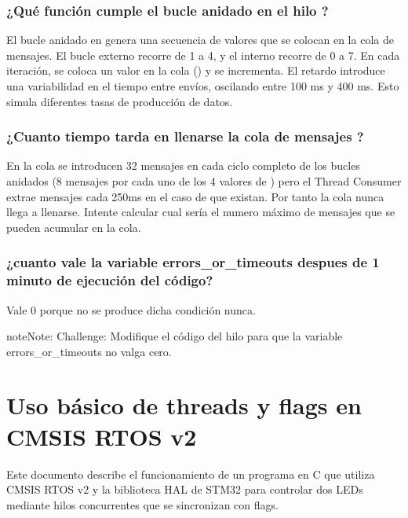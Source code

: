 \documentclass[letterpaper,10pt,english]{sphinxmanual}
\begin{document}
\subsection{¿Qué función cumple el bucle anidado en el hilo ?}
\label{\detokenize{ejemplothreads-queues:que-funcion-cumple-el-bucle-anidado-en-el-hilo-producer}}
\sphinxAtStartPar
El bucle anidado en  genera una secuencia de valores que se colocan en la cola de mensajes. El bucle externo recorre  de 1 a 4, y el interno recorre  de 0 a 7. En cada iteración, se coloca un valor en la cola () y se incrementa. El retardo  introduce una variabilidad en el tiempo entre envíos, oscilando entre 100 ms y 400 ms. Esto simula diferentes tasas de producción de datos.


\subsection{¿Cuanto tiempo tarda en llenarse la cola de mensajes ?}
\label{\detokenize{ejemplothreads-queues:cuanto-tiempo-tarda-en-llenarse-la-cola-de-mensajes-id-msgqueue}}
\sphinxAtStartPar
En la cola se introducen 32 mensajes en cada ciclo completo de los bucles anidados (8 mensajes por cada uno de los 4 valores de ) pero el Thread Consumer extrae mensajes cada 250ms en el caso de que existan. Por tanto la cola nunca llega a llenarse.
Intente calcular cual sería el numero máximo de mensajes que se pueden acumular en la cola.


\subsection{¿cuanto vale la variable errors\_or\_timeouts despues de 1 minuto de ejecución del código?}
\label{\detokenize{ejemplothreads-queues:cuanto-vale-la-variable-errors-or-timeouts-despues-de-1-minuto-de-ejecucion-del-codigo}}
\sphinxAtStartPar
Vale 0 porque no se produce dicha condición nunca.

\begin{sphinxadmonition}{note}{Note:}
\sphinxAtStartPar
Challenge: Modifique el código del hilo  para que la variable errors\_or\_timeouts no valga cero.
\end{sphinxadmonition}

\sphinxstepscope


\chapter{Uso básico de threads y flags en CMSIS RTOS v2}
\label{\detokenize{ejemplothreads-flags:uso-basico-de-threads-y-flags-en-cmsis-rtos-v2}}\label{\detokenize{ejemplothreads-flags::doc}}
\sphinxAtStartPar
Este documento describe el funcionamiento de un programa en C que utiliza CMSIS RTOS v2 y la biblioteca HAL de STM32 para controlar dos LEDs mediante hilos concurrentes que se sincronizan con flags.
\end{document}
